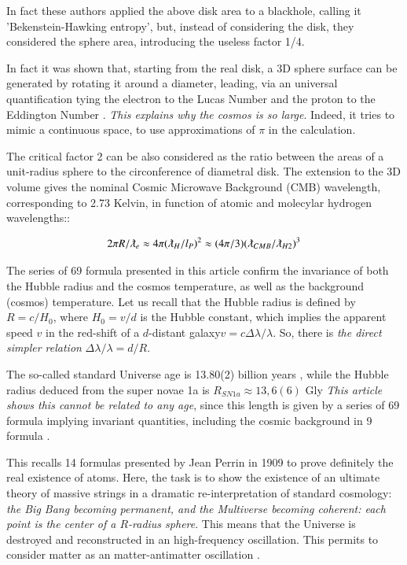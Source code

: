 \documentclass[a4paper,9pt]{article}
\begin{document}
    
    In fact these authors applied the above disk area to a blackhole, calling it 'Bekenstein-Hawking entropy'\cite{Bekenstein}, but, instead of considering the disk, they considered the sphere area, introducing the useless factor 1/4. 
    
    
    In fact it was shown that, starting from the real disk, a 3D sphere surface can be generated by rotating it around a diameter, leading, via an universal quantification tying the electron to the Lucas Number and the proton to the Eddington Number \cite{Sanchez}. \textit {This explains why the cosmos is so large}. Indeed, it tries to mimic a continuous space, to use approximations of $\pi$ in  the calculation.
    
    
    The critical factor 2 can be also considered as the ratio between the areas of a unit-radius sphere to the circonference of diametral disk. The extension to the 3D volume gives the nominal Cosmic Microwave Background (CMB) wavelength, corresponding to 2.73 Kelvin, in function of atomic and molecylar hydrogen wavelengths:\cite{Sanchez}:
    
    \begin{equation}
        2\pi R/\lambdabar_e \approx 4\pi (\lambdabar_H/l_P)^2 \approx (4\pi/3) (\lambdabar_{CMB}/\lambdabar_{H2})^3
    \end{equation}

    The series of 69 formula presented in this article confirm the invariance of both the Hubble radius and the cosmos temperature, as well as the background (cosmos) temperature. Let us recall that the Hubble radius is defined by $R = c/H_0$, where $H_0 = v/d$ is the Hubble constant, which implies the apparent speed $v$ in the red-shift of a $d$-distant galaxy$ v = c \Delta \lambda/\lambda$. So, there is \textit {the direct simpler relation} $\Delta \lambda/\lambda =  d/R$. 
    

    
    The so-called standard Universe age is 13.80(2) billion years \cite{Tanabashi}, while the Hubble radius deduced from the super novae 1a is $R_{SN1a} \approx 13,6(6)$ Gly \cite{Freeman}\textit{This article shows this cannot be related to any age}, since this length is given by a series of 69 formula implying invariant quantities, including the cosmic background in 9 formula . 
    
    
    This recalls 14 formulas presented by Jean Perrin in 1909 to prove definitely the real existence of atoms. Here, the task is to show the existence of an ultimate theory of massive strings in a dramatic re-interpretation of standard cosmology:\textit{ the Big Bang becoming permanent, and the Multiverse becoming coherent: each point is the center of a $R$-radius sphere}. This means that the Universe is destroyed and reconstructed in an high-frequency oscillation. This permits to consider matter as an matter-antimatter oscillation \cite{Sanchez2}. 
    
\end{document}
